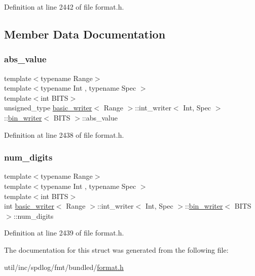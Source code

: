 Definition at line 2442 of file format.\+h.



\subsection{Member Data Documentation}
\mbox{\label{structbasic__writer_1_1int__writer_1_1bin__writer_a8c7736e764f844fbe64dcec0a94530dd}} 
\subsubsection{\texorpdfstring{abs\+\_\+value}{abs\_value}}
{\footnotesize\ttfamily template$<$typename Range$>$ \\
template$<$typename Int , typename Spec $>$ \\
template$<$int B\+I\+TS$>$ \\
unsigned\+\_\+type \hyperlink{classbasic__writer}{basic\+\_\+writer}$<$ Range $>$\+::int\+\_\+writer$<$ Int, Spec $>$\+::\hyperlink{structbasic__writer_1_1int__writer_1_1bin__writer}{bin\+\_\+writer}$<$ B\+I\+TS $>$\+::abs\+\_\+value}



Definition at line 2438 of file format.\+h.

\mbox{\label{structbasic__writer_1_1int__writer_1_1bin__writer_abc4feafeba4c2919f9c04a1fd5ec1a1b}} 
\subsubsection{\texorpdfstring{num\+\_\+digits}{num\_digits}}
{\footnotesize\ttfamily template$<$typename Range$>$ \\
template$<$typename Int , typename Spec $>$ \\
template$<$int B\+I\+TS$>$ \\
int \hyperlink{classbasic__writer}{basic\+\_\+writer}$<$ Range $>$\+::int\+\_\+writer$<$ Int, Spec $>$\+::\hyperlink{structbasic__writer_1_1int__writer_1_1bin__writer}{bin\+\_\+writer}$<$ B\+I\+TS $>$\+::num\+\_\+digits}



Definition at line 2439 of file format.\+h.



The documentation for this struct was generated from the following file\+:\begin{DoxyCompactItemize}
\item 
util/inc/spdlog/fmt/bundled/\hyperlink{format_8h}{format.\+h}\end{DoxyCompactItemize}
